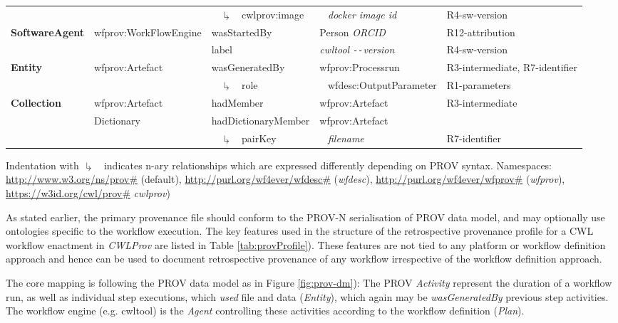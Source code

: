 \documentclass[a4paper,num-refs]{oup-contemporary}
\newcommand{\return}{$\drsh$ ~}
\newcommand{\nary}[1]{
 ~ \return #1
}
\newcommand{\placeholder}[1]{
 \textit{#1}
}
\begin{document}
\begin{table}[!htbp]
\begin{tabularx}{\linewidth}{l l l l L}
 \\
 & & \nary{cwlprov:image} & ~ \placeholder{docker image id} & R4-sw-version \\
 \textbf{SoftwareAgent} & wfprov:WorkFlowEngine & wasStartedBy & Person \placeholder{ORCID} & R12-attribution \\
 & & label & \placeholder{cwltool \texttt{-{}-}version} & R4-sw-version \\
 \textbf{Entity} & wfprov:Artefact & wasGeneratedBy & wfprov:Processrun & R3-intermediate, R7-identifier \\
 & & \nary{role} & ~ wfdesc:OutputParameter & R1-parameters \\
 \textbf{Collection} & wfprov:Artefact & hadMember & wfprov:Artefact & R3-intermediate\\
 & Dictionary & hadDictionaryMember & wfprov:Artefact & \\
 & & \nary{pairKey} & ~ \placeholder{filename} & R7-identifier \\
\bottomrule
\end{tabularx}
\begin{tablenotes}
\item Indentation with \return indicates n-ary relationships which are expressed differently depending on PROV syntax.
Namespaces:
\url{http://www.w3.org/ns/prov#} (default), 
\url{http://purl.org/wf4ever/wfdesc#} (\textit{wfdesc}),
\url{http://purl.org/wf4ever/wfprov#} (\textit{wfprov}),
\url{https://w3id.org/cwl/prov#} \textit{cwlprov})
\end{tablenotes}
\end{table}
As stated earlier, the primary provenance file should conform to the PROV-N \citep{moreau_2013} serialisation of PROV data model, and may optionally use ontologies specific to the workflow execution. The key features used in the structure of the retrospective provenance profile for a CWL workflow enactment in \textit{CWLProv} are listed in Table \ref{tab:provProfile}). These features are not tied to any platform or workflow definition approach and hence can be used to document retrospective provenance of any workflow irrespective of the workflow definition approach. 

The core mapping is following the PROV data model as in Figure \ref{fig:prov-dm}): The PROV \emph{Activity} represent the duration of a workflow run, as well as individual step executions, which \emph{used} file and data (\emph{Entity}), which again may be \emph{wasGeneratedBy} previous step activities. The workflow engine (e.g. cwltool) is the \emph{Agent} controlling these activities according to the workflow definition (\emph{Plan}).
\end{document}
